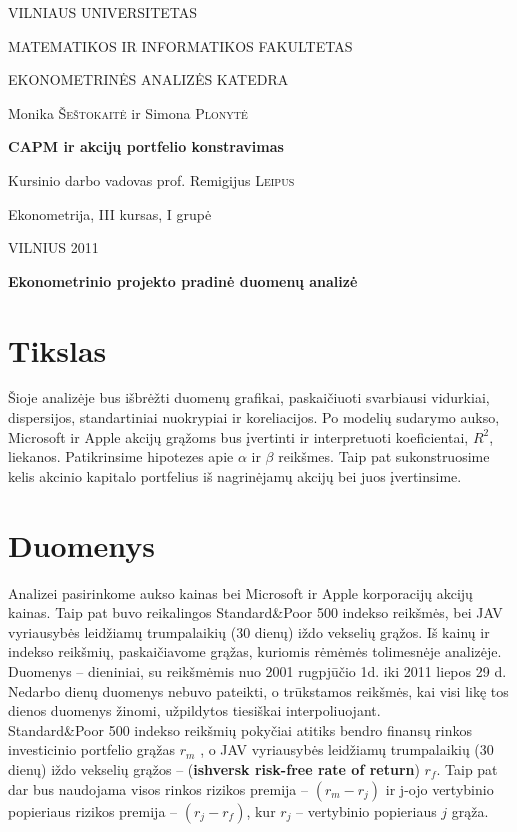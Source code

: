 \documentclass[a4paper]{article}
\begin{document}
\begin{titlepage}
\centerline{ \large VILNIAUS UNIVERSITETAS}
\bigskip
\centerline{\large MATEMATIKOS IR INFORMATIKOS FAKULTETAS}
\smallskip

\centerline{\large  EKONOMETRINĖS ANALIZĖS KATEDRA}
\vskip 200pt
\centerline{ \large Monika \textsc{Šeštokaitė} ir \large Simona \textsc{Plonytė}}
\vskip 50pt
\centerline{\bf \Large CAPM ir akcijų portfelio konstravimas}
\bigskip
\vskip 25pt
\centerline{Kursinio darbo vadovas prof. \large {Remigijus} \textsc{Leipus}}
\vskip 25pt
\hfill Ekonometrija, III kursas, I grupė
\vskip 100pt
\centerline{\large VILNIUS 2011}
\end{titlepage}

\pagebreak

\centerline{\bf \Large Ekonometrinio projekto pradinė duomenų analizė}

\section{ Tikslas}
Šioje analizėje bus išbrėžti duomenų grafikai, paskaičiuoti svarbiausi vidurkiai, dispersijos, standartiniai nuokrypiai ir koreliacijos. Po modelių sudarymo aukso, Microsoft ir Apple akcijų grąžoms bus įvertinti ir interpretuoti koeficientai, $ R^2 $, liekanos. Patikrinsime hipotezes apie $ \alpha $  ir $ \beta $ reikšmes. Taip pat sukonstruosime kelis akcinio kapitalo portfelius iš nagrinėjamų akcijų bei juos įvertinsime.

\section{ Duomenys}
Analizei pasirinkome aukso kainas bei Microsoft ir Apple korporacijų akcijų kainas. Taip pat buvo reikalingos Standard\&Poor 500 indekso reikšmės, bei JAV vyriausybės leidžiamų trumpalaikių (30 dienų) iždo vekselių grąžos. Iš kainų ir indekso reikšmių, paskaičiavome grąžas, kuriomis rėmėmės tolimesnėje analizėje. Duomenys -- dieniniai, su reikšmėmis nuo 2001 rugpjūčio 1d. iki 2011 liepos 29 d. Nedarbo dienų duomenys nebuvo pateikti, o trūkstamos reikšmės, kai visi likę tos dienos duomenys žinomi, užpildytos tiesiškai interpoliuojant.\\
  Standard\&Poor 500 indekso reikšmių pokyčiai atitiks bendro finansų rinkos investicinio portfelio grąžas $ r_m $ , o JAV vyriausybės leidžiamų trumpalaikių (30 dienų) iždo vekselių grąžos --       (\textbf{ishversk risk-free rate of return}) $ r_f $. Taip pat dar bus naudojama visos rinkos rizikos premija -- $ (r_m - r_j) $ ir j-ojo vertybinio popieriaus rizikos premija -- $ (r_j - r_f) $, kur $ r_j $ -- vertybinio popieriaus $ j $ grąža.
\end{document}
